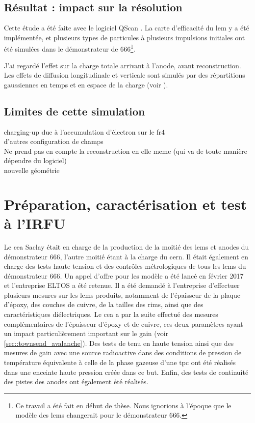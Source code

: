             
        \subsection{Résultat : impact sur la résolution}
        
            Cette étude a été faite avec le logiciel QScan \cite{qscan}. La carte d'efficacité du \gls{lem} y a été implémentée, et plusieurs types de particules à plusieurs impulsions initiales ont été simulées dans le démonstrateur de 666\footnote{Ce travail a été fait en début de thèse. Nous ignorions à l'époque que le modèle des \glspl{lem} changerait pour le démonstrateur 666.}.
            
            J'ai regardé l'effet sur la charge totale arrivant à l'anode, avant reconstruction. Les effets de diffusion longitudinale et verticale sont simulés par des répartitions gaussiennes en temps et en espace de la charge (voir \cite{diffusion}).
            
        
        \subsection{Limites de cette simulation}
            charging-up due à l'accumulation d'électron sur le \gls{fr4}\\
            d'autres configuration de champs\\
            Ne prend pas en compte la reconstruction en elle meme (qui va de toute manière dépendre du logiciel)\\
            nouvelle géométrie
        
    \section{Préparation, caractérisation et test à l'IRFU}
    
        Le \gls{cea} Saclay était en charge de la production de la moitié des \glspl{lem} et anodes du démonstrateur 666, l'autre moitié étant à la charge du \gls{cern}. Il était également en charge des tests haute tension et des contrôles métrologiques de tous les \glspl{lem} du démonstrateur 666. Un appel d'offre pour les modèle a été lancé en février 2017 et l'entreprise ELTOS a été retenue. Il a été demandé à l'entreprise d'effectuer plusieurs mesures sur les \glspl{lem} produits, notamment de l'épaisseur de la plaque d'époxy, des couches de cuivre, de la tailles des rims, ainsi que des caractéristiques diélectriques. Le \gls{cea} a par la suite effectué des mesures complémentaires de l'épaisseur d'époxy et de cuivre, ces deux paramètres ayant un impact particulièrement important sur le gain (voir \autoref{sec::townsend_avalanche}). Des tests de tenu en haute tension ainsi que des mesures de gain avec une source radioactive dans des conditions de pression de température équivalente à celle de la phase gazeuse d'une \gls{tpc} ont été réalisés dans une enceinte haute pression créée dans ce but. Enfin, des tests de continuité des pistes des anodes ont également été réalisés.
        
